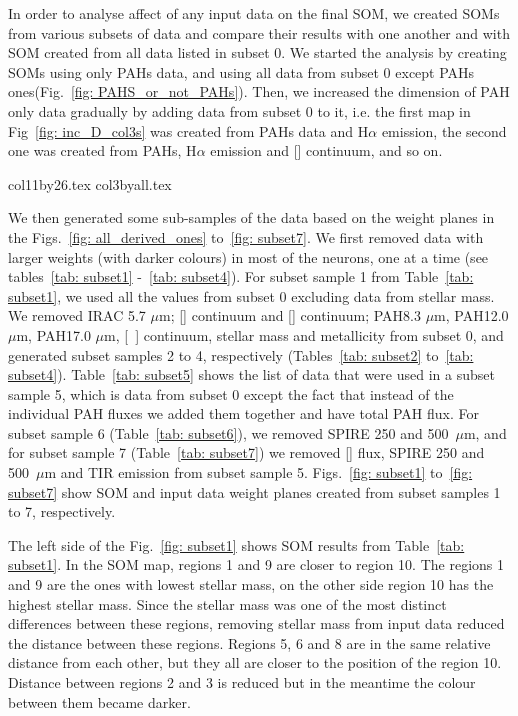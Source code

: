             In order to analyse affect of any input data on the final SOM, we created SOMs from various subsets of data and compare their results with one another and with SOM created from all data listed in subset 0.
            We started the analysis by creating SOMs using only PAHs data, and using all data from subset 0 except PAHs ones(Fig.~\ref{fig: PAHS_or_not_PAHs}). 
            Then, we increased the dimension of PAH only data gradually by adding data from subset 0 to it, i.e. the first map in Fig~\ref{fig: inc_D_col3s} was created from PAHs data and H$\alpha$ emission, the second one was created from PAHs, H$\alpha$ emission and [\sii] continuum, and so on. 

        {col11by26.tex}
        {col3byall.tex}


         We then generated some sub-samples of the data based on the weight planes in the Figs.~\ref{fig: all_derived_ones} to~\ref{fig: subset7}.
        We first removed data with larger weights (with darker colours) in most of the neurons, one at a time (see tables~\ref{tab: subset1} -~\ref{tab: subset4}).
        For subset sample 1 from Table~\ref{tab: subset1}, we used all the values from subset 0 excluding data from stellar mass. 
        We removed IRAC 5.7 $\mu$m; [\sii] continuum and [\oiii] continuum; PAH8.3 $\mu$m, PAH12.0 $\mu$m, PAH17.0 $\mu$m, [~\oiii] continuum, stellar mass and metallicity from subset 0, and generated subset samples 2 to 4, respectively (Tables~\ref{tab: subset2} to~\ref{tab: subset4}).
        Table~\ref{tab: subset5} shows the list of data that were used in a subset sample 5, which is data from subset 0 except the fact that instead of the individual PAH fluxes we added them together and have total PAH flux. 
        For subset sample 6 (Table~\ref{tab: subset6}), we removed SPIRE 250 and 500~$\mu$m, and for subset sample 7 (Table~\ref{tab: subset7}) we removed [\sii] flux, SPIRE 250 and 500~$\mu$m and TIR emission from subset sample 5.
        Figs.~\ref{fig: subset1} to~\ref{fig: subset7} show SOM and input data weight planes created from subset samples 1 to 7, respectively.

        The left side of the Fig.~\ref{fig: subset1} shows SOM results from Table~\ref{tab: subset1}. 
        In the SOM map, regions 1 and 9 are closer to region 10. 
        The regions 1 and 9 are the ones with lowest stellar mass, on the other side region 10 has the highest stellar mass. 
        Since the stellar mass was one of the most distinct differences between these regions, removing stellar mass from input data reduced the distance between these regions.
        Regions 5, 6 and 8 are in the same relative distance from each other, but they all are closer to the position of the region 10.
        Distance between regions 2 and 3 is reduced but in the meantime the colour between them became darker.

